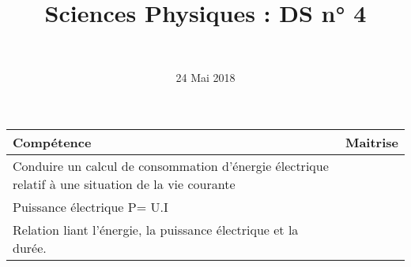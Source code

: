 \documentclass[a4paper,11pt]{exam}
\author{\ }
\date{24 Mai 2018}
\title{Sciences Physiques : DS n° 4}
\begin{document}
%	

	\maketitle
	
\begin{small}
	\begin{center}
		\begin{tabular}{|@{\ }l@{}|@{\ }c@{\ }|}
			\hline
			\textbf{Compétence} & \textbf{Maitrise} \\
			\hline
		Conduire un calcul de consommation d’énergie électrique relatif à une situation de la vie courante \ &  \ \ \ \\
			\hline
			Puissance électrique P= U.I  &  \\
			\hline			
			Relation liant l’énergie, la puissance électrique et la durée. \ &  \\
			\hline
		\end{tabular}
	\end{center}
\end{small}	
	
	
\vspace*{-0.5cm}	



























 
%
\ \label{LastPage}
\end{document}
